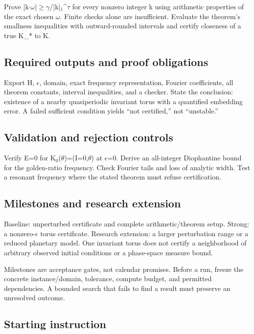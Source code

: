 \documentclass[
  11pt,
]{article}
\begin{document}
Prove
|k\ensuremath{\cdot}\ensuremath{\omega}|\ensuremath{\ge}\ensuremath{\gamma}/|k|\ensuremath{{}_{1}}\textasciicircum{}\ensuremath{\tau}
for every nonzero integer k using arithmetic properties of the exact
chosen \ensuremath{\omega}. Finite checks alone are insufficient.
Evaluate the theorem's smallness inequalities with outward-rounded
intervals and certify closeness of a true K\_* to K.

\subsection{Required outputs and proof obligations}

Export H, \ensuremath{\epsilon}, domain, exact frequency representation,
Fourier coefficients, all theorem constants, interval inequalities, and
a checker. State the conclusion: existence of a nearby quasiperiodic
invariant torus with a quantified embedding error. A failed sufficient
condition yields ``not certified,'' not ``unstable.''

\subsection{Validation and rejection controls}

Verify E=0 for
K\ensuremath{{}_{0}}(\ensuremath{\theta})=(I=0,\ensuremath{\theta}) at
\ensuremath{\epsilon}=0. Derive an all-integer Diophantine bound for the
golden-ratio frequency. Check Fourier tails and loss of analytic width.
Test a resonant frequency where the stated theorem must refuse
certification.

\subsection{Milestones and research extension}

Baseline: unperturbed certificate and complete arithmetic/theorem setup.
Strong: a nonzero-\ensuremath{\epsilon} torus certificate. Research
extension: a larger perturbation range or a reduced planetary model. One
invariant torus does not certify a neighborhood of arbitrary observed
initial conditions or a phase-space measure bound.

Milestones are acceptance gates, not calendar promises. Before a run,
freeze the concrete instance/domain, tolerance, compute budget, and
permitted dependencies. A bounded search that fails to find a result
must preserve an unresolved outcome.

\subsection{Starting instruction}
\end{document}
